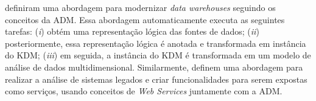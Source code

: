 


 definiram uma abordagem para modernizar \textit{data warehouses} seguindo os conceitos da ADM. Essa abordagem automaticamente executa as seguintes tarefas: (\textit{i}) obtém uma representação lógica das fontes de dados; (\textit{ii}) posteriormente, essa representação lógica é anotada e transformada em instância do KDM; (\textit{iii}) em seguida, a instância do KDM é transformada em um modelo de análise de dados multidimensional. Similarmente,  definem uma abordagem para realizar a análise de sistemas legados e criar funcionalidades para serem expostas como serviços, usando conceitos de \textit{Web Services} juntamente com a ADM.




